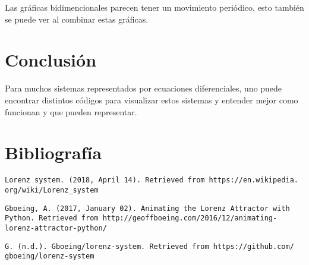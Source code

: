 \documentclass{article}
\begin{document}
Las gráficas bidimencionales parecen tener un movimiento periódico, esto también se puede ver al combinar estas gráficas.

\section*{Conclusión}
Para muchos sistemas representados por ecuaciones diferenciales, uno puede encontrar distintos códigos para visualizar estos sistemas y entender mejor como funcionan y que pueden representar.  

\section*{Bibliografía}

\begin{verbatim}
Lorenz system. (2018, April 14). Retrieved from https://en.wikipedia.
org/wiki/Lorenz_system 
\end{verbatim}

\begin{verbatim}
Gboeing, A. (2017, January 02). Animating the Lorenz Attractor with
Python. Retrieved from http://geoffboeing.com/2016/12/animating-
lorenz-attractor-python/ 
\end{verbatim}

\begin{verbatim}
G. (n.d.). Gboeing/lorenz-system. Retrieved from https://github.com/
gboeing/lorenz-system 
\end{verbatim}
\end{document}
